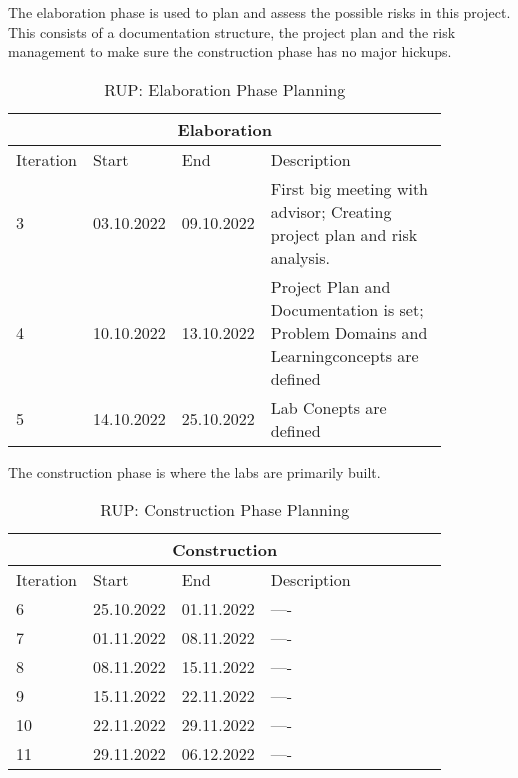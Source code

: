 \noindent The elaboration phase is used to plan and assess the possible risks in this project. This consists of a documentation structure, the project plan and the risk management to make sure the construction phase has no major hickups.
\begin{table}[H]
    \centering
    \begin{tabular}{|p{0.1\linewidth}|p{0.15\linewidth}|p{0.15\linewidth}|p{0.46\linewidth}|}
        \hline
        \multicolumn{4}{||c||}{\textbf{Elaboration}} \\
        \hline \hline
        Iteration & Start & End & Description \\
        \hline \hline
        3 & 03.10.2022 & 09.10.2022 &  First big meeting with advisor; Creating project plan and risk analysis.\\
        \hline
        4 & 10.10.2022 & 13.10.2022 & Project Plan and Documentation is set; Problem Domains and Learningconcepts are defined \\
        \hline
        5 & 14.10.2022 & 25.10.2022 & Lab Conepts are defined \\
        \hline
    \end{tabular}
    \caption{RUP: Elaboration Phase Planning}
    \label{elaboration_table}
\end{table}

\noindent The construction phase is where the labs are primarily built. 
\begin{table}[H]
    \centering
    \begin{tabular}{|p{0.1\linewidth}|p{0.15\linewidth}|p{0.15\linewidth}|p{0.46\linewidth}|}
        \hline
        \multicolumn{4}{||c||}{\textbf{Construction}} \\
        \hline \hline
        Iteration & Start & End & Description \\
        \hline \hline
        6 & 25.10.2022 & 01.11.2022 & ----\\
        \hline
        7 & 01.11.2022 & 08.11.2022 & ---- \\
        \hline
        8 & 08.11.2022 & 15.11.2022 & ---- \\
        \hline
        9 & 15.11.2022 & 22.11.2022 & ---- \\
        \hline
        10 & 22.11.2022 & 29.11.2022 & ---- \\
        \hline
        11 & 29.11.2022 & 06.12.2022 & ---- \\
        \hline
    \end{tabular}
    \caption{RUP: Construction Phase Planning}
    \label{construction_table}
\end{table}

